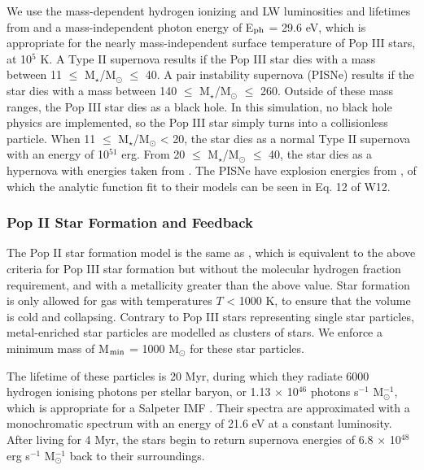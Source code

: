 \documentclass[a4paper,fleqn,usenatbib]{mnras}
\begin{document}
We use the mass-dependent hydrogen ionizing and LW luminosities and lifetimes from \citet{Schaerer02} and a mass-independent photon energy of E$_{\rm ph}$ = 29.6 eV, which is appropriate for the nearly mass-independent surface temperature of Pop III stars, at 10$^{5}$ K. A Type II supernova results if the Pop III star dies with a mass between 11 $\leq$ M$_{\star}$/M$_{\odot}$ $\leq$ 40. A pair instability supernova (PISNe) results if the star dies with a mass between 140 $\leq$ M$_{\star}$/M$_{\odot}$ $\leq$ 260. Outside of these mass ranges, the Pop III star dies as a black hole. In this simulation, no black hole physics are implemented, so the Pop III star simply turns into a collisionless particle. When 11 $\leq$ M$_{\star}$/M$_{\odot}$ < 20, the star dies as a normal Type II supernova with an energy of 10$^{51}$ erg. From 20 $\leq$ M$_{\star}$/M$_{\odot}$ $\leq$ 40, the star dies as a hypernova with energies taken from \citet{Nomoto06}. The PISNe have explosion energies from \citet{2002ApJ...567..532H}, of which the analytic function fit to their models can be seen in Eq. 12 of W12. 

\subsubsection{Pop II  Star Formation and Feedback}
The Pop II star formation model is the same as \citet{Wise09}, which is equivalent to the above criteria for Pop III star formation but without the molecular hydrogen fraction requirement, and with a metallicity greater than the above value. Star formation is only allowed for gas with temperatures $T$ < 1000 K, to ensure that the volume is cold and collapsing. Contrary to Pop III stars representing single star particles, metal-enriched star particles are modelled as clusters of stars. We enforce a minimum mass of M$_{\rm min}$ = 1000 M$_{\odot}$ for these star particles. 

The lifetime of these particles is 20 Myr, during which they radiate 6000 hydrogen ionising photons per stellar baryon, or 1.13 $\times$ 10$^{46}$ photons s$^{-1}$ M$_{\odot}^{-1}$, which is appropriate for a Salpeter IMF \citep{Schaerer03}. Their spectra are approximated with a monochromatic spectrum with an energy of 21.6 eV at a constant luminosity. After living for 4 Myr, the stars begin to return supernova energies of 6.8 $\times$ 10$^{48}$ erg s$^{-1}$ M$_{\odot}^{-1}$ back to their surroundings.
\end{document}
